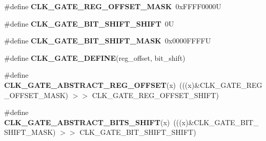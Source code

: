 \begin{DoxyCompactItemize}
\#define {\bfseries C\+L\+K\+\_\+\+G\+A\+T\+E\+\_\+\+R\+E\+G\+\_\+\+O\+F\+F\+S\+E\+T\+\_\+\+M\+A\+SK}~0x\+F\+F\+F\+F0000U
\item 
\mbox{\label{group__clock_gaf4e6bc96a2cb37ce4fdb4693b98c11bd}} 
\#define {\bfseries C\+L\+K\+\_\+\+G\+A\+T\+E\+\_\+\+B\+I\+T\+\_\+\+S\+H\+I\+F\+T\+\_\+\+S\+H\+I\+FT}~0U
\item 
\mbox{\label{group__clock_ga4eac9e49fd14c82edbf420e980337a43}} 
\#define {\bfseries C\+L\+K\+\_\+\+G\+A\+T\+E\+\_\+\+B\+I\+T\+\_\+\+S\+H\+I\+F\+T\+\_\+\+M\+A\+SK}~0x0000\+F\+F\+F\+FU
\item 
\#define {\bfseries C\+L\+K\+\_\+\+G\+A\+T\+E\+\_\+\+D\+E\+F\+I\+NE}(reg\+\_\+offset,  bit\+\_\+shift)
\item 
\mbox{\label{group__clock_ga373b3474ba7bd923f9846ff9260e4269}} 
\#define {\bfseries C\+L\+K\+\_\+\+G\+A\+T\+E\+\_\+\+A\+B\+S\+T\+R\+A\+C\+T\+\_\+\+R\+E\+G\+\_\+\+O\+F\+F\+S\+ET}(x)~(((x)\&C\+L\+K\+\_\+\+G\+A\+T\+E\+\_\+\+R\+E\+G\+\_\+\+O\+F\+F\+S\+E\+T\+\_\+\+M\+A\+SK) $>$$>$ C\+L\+K\+\_\+\+G\+A\+T\+E\+\_\+\+R\+E\+G\+\_\+\+O\+F\+F\+S\+E\+T\+\_\+\+S\+H\+I\+FT)
\item 
\mbox{\label{group__clock_ga169a30aff4ee0cd13f09b71e7c46b538}} 
\#define {\bfseries C\+L\+K\+\_\+\+G\+A\+T\+E\+\_\+\+A\+B\+S\+T\+R\+A\+C\+T\+\_\+\+B\+I\+T\+S\+\_\+\+S\+H\+I\+FT}(x)~(((x)\&C\+L\+K\+\_\+\+G\+A\+T\+E\+\_\+\+B\+I\+T\+\_\+\+S\+H\+I\+F\+T\+\_\+\+M\+A\+SK) $>$$>$ C\+L\+K\+\_\+\+G\+A\+T\+E\+\_\+\+B\+I\+T\+\_\+\+S\+H\+I\+F\+T\+\_\+\+S\+H\+I\+FT)
\end{DoxyCompactItemize}
